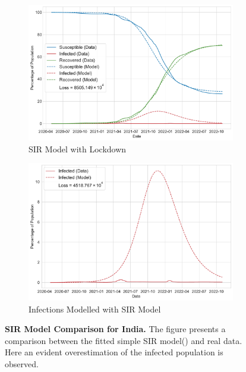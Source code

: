 \documentclass[tikz,fleqn,12pt]{wlscirep}
\begin{document}
\begin{figure}[htbp!]
  \centering
  \begin{subfigure}[t]{\textwidth}
    \centering
    \includegraphics[scale=0.5]{images/SIR_model_IND.pdf}
    \caption{SIR Model with Lockdown}
    \label{fig:SIR_model_IND}
  \end{subfigure}
  \begin{subfigure}[t]{\textwidth}
    \centering
    \includegraphics[scale=0.50]{images/SIR_model_infections_IND.pdf}
    \caption{Infections Modelled with SIR Model}
    \label{fig:SIR_model_infections_IND}
  \end{subfigure}
  \caption{\textbf{SIR Model Comparison for India.} The figure presents a comparison between the fitted simple SIR model() and real data. Here an evident overestimation of the infected population is observed.}
\end{figure}
\end{document}
